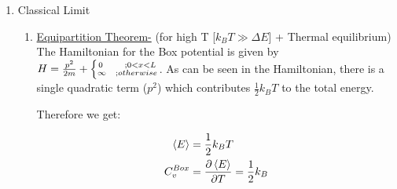 \documentclass{article}
\numberwithin{equation}{subsection}
\begin{document}
\begin{enumerate}
\begin{itemize}
        \begin{equation}
        \begin{split}
            C_v &= \frac{\partial \expval{E} }{\partial T} = 
            \frac{\partial \expval{E} }{\partial \beta} \frac{\partial \beta}{\partial T} \\ &= 
            -k_B \beta^2 \cdot \frac{\partial}{\partial \beta} \left( \frac{\sum_{n=1}^\infty E_n e^{-\beta E_n}}{Z} \right) \\ &= 
            -k_B \beta^2 \cdot \frac{\left( -\sum_{n=1}^\infty E_n^2 e^{-\beta E_n} \right)Z - \left( \sum_{n=1}^\infty E_n e^{-\beta E_n} \right) \left( -\sum_{n=1}^\infty E_ne^{-\beta E_n} \right)}{Z^2} \\ &=
            -k_B \beta^2 \cdot \left[ -\frac{\sum_{n=1}^\infty E_n^2 e^{-\beta E_n} }{Z} + \left( \frac{\sum_{n=1}^\infty E_n e^{-\beta E_n} }{Z} \right)^2 \right]
            \\ &=
            k_B \beta^2 (\expval{E^2} - \expval{E}^2) = k_B \beta^2 \cdot Var(E)
        \end{split}
        \end{equation}
        
        We can see here that we arrived at a derivation for the Heat Capacity using the variance of the energy of the system, which can be calculated numerically by truncating the infinite sum to a finite energy level.
    
    \end{itemize}
    
\item{Classical Limit}

    \begin{enumerate}
    
        \item \underline{Equipartition Theorem-} (for high T [$k_BT \gg \Delta E$] + Thermal equilibrium)
        The Hamiltonian for the Box potential is given by $H = \frac{p^2}{2m} + \left\{ \substack{0 \hspace{0.7cm} ;0<x<L \\ \infty \hspace{0.3cm} ;otherwise} \right.$. As can be seen in the Hamiltonian, there is a single quadratic term ($p^2$) which contributes $\frac{1}{2}k_BT$ to the total energy. 
        
        Therefore we get:
        
        \begin{equation}
        \begin{split}
            \expval{E} &= \frac{1}{2}k_BT 
            \\
            C_v^{Box} &= \frac{\partial \expval{E}}{\partial T} = \frac{1}{2}k_B 
        \end{split}
        \end{equation}
        

\end{enumerate}
\end{enumerate}
\end{document}
